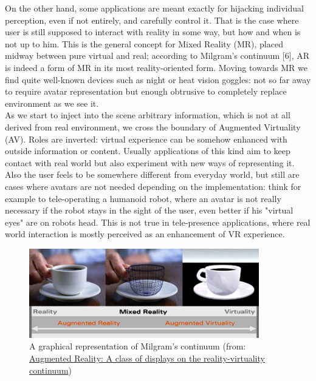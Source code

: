On the other hand, some applications are meant exactly for hijacking individual perception, even if not entirely, and carefully control it. That is the case where user is still supposed to interact with reality in some way, but how and when is not up to him. This is the general concept for Mixed Reality (MR), placed midway between pure virtual and real; according to Milgram’s continuum [6], AR is indeed a form of MR in its most reality-oriented form. Moving towards MR we find quite well-known devices such as night or heat vision goggles: not so far away to require avatar representation but enough obtrusive to completely replace environment as we see it.\\
As we start to inject into the scene arbitrary information, which is not at all derived from real environment, we cross the boundary of Augmented Virtuality (AV). Roles are inverted: virtual experience can be somehow enhanced with outside information or content. Usually applications of this kind aim to keep contact with real world but also experiment with new ways of representing it. Also the user feels to be somewhere different from everyday world, but still are cases where avatars are not needed depending on the implementation: think for example to tele-operating a humanoid robot, where an avatar is not really necessary if the robot stays in the sight of the user, even better if his "virtual eyes" are on robots head. This is not true in tele-presence applications, where real world interaction is mostly perceived as an enhancement of VR experience.

\begin{figure}
\centering
\includegraphics[width=10cm]{schemas/milgram_continuum_enhanced}
\caption{A graphical representation of Milgram's continuum (from: \href{http://proceedings.spiedigitallibrary.org/proceeding.aspx?articleid=981543}{Augmented Reality: A class of displays on the reality-virtuality continuum})}
\label{fig:milgram_continuum}
\end{figure}

